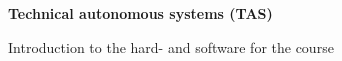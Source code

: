 \begin{titlepage}
\begin{center}
  \vspace{3cm}
  
  {\Huge \bf \sffamily  Technical autonomous systems (TAS)}
  
  \vspace{1cm}
  
  {\small \sffamily Introduction to the hard- and software for the course}    

  \vspace{2cm}
    
                
\end{center}      
\end{titlepage}

